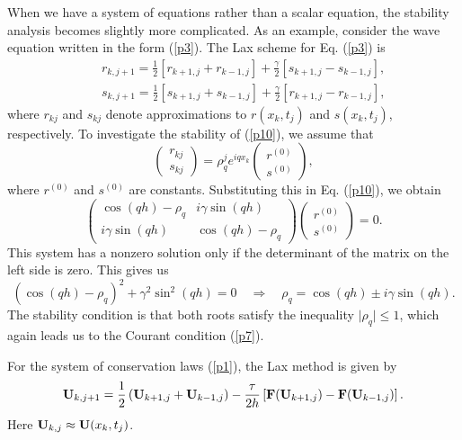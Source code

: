  
 
When we have a system of equations rather than a scalar equation, the stability analysis becomes
slightly more complicated. As an example, consider the wave equation written in the form  (\ref{p3}).
The Lax scheme for Eq. (\ref{p3}) is
\begin{eqnarray}
&&r_{k,j+1}=\frac{1}{2}[r_{k+1,j}+r_{k-1,j}] + \frac{\gamma}{2}\left[s_{k+1,j}-s_{k-1,j}\right], \nonumber \\
&&s_{k,j+1}=\frac{1}{2}[s_{k+1,j}+s_{k-1,j}] +
\frac{\gamma}{2}\left[r_{k+1,j}-r_{k-1,j}\right], \label{p10}
\end{eqnarray}
where $r_{kj}$ and $s_{kj}$ denote approximations to $r(x_{k},t_{j})$ and $s(x_{k},t_{j})$, respectively.
To investigate the stability of (\ref{p10}), we assume that
\begin{equation}
\left(
\begin{array}{c}
r_{kj} \\
s_{kj}
\end{array}
\right)=\rho_{q}^{j}e^{iqx_{k}}
\left(
\begin{array}{c}
r^{(0)} \\
s^{(0)}
\end{array}
\right), \label{p11}
\end{equation}
where $r^{(0)}$ and $s^{(0)}$ are constants.
Substituting this in Eq. (\ref{p10}), we obtain
\begin{equation}
\left(
\begin{array}{cc}
\cos(qh)-\rho_{q} &i\gamma\sin(qh) \\
i\gamma\sin(qh)   &\cos(qh)-\rho_{q}
\end{array}
\right)
\left(
\begin{array}{c}
r^{(0)} \\
s^{(0)}
\end{array}
\right)=0. \nonumber
\end{equation}
This system has a nonzero solution only if the determinant of the matrix on the left side
is zero. This gives us
\[
(\cos(qh)-\rho_{q})^2+\gamma^2\sin^2(qh)=0 \quad \Rightarrow \quad
\rho_{q}=\cos(qh)\pm i\gamma\sin(qh).
\]
The stability condition is that both roots satisfy the inequality $\vert\rho_{q}\vert\leq 1$, which again
leads us to the Courant condition (\ref{p7}).


 
 
For the system of conservation laws (\ref{p1}), the Lax
method is given by
\begin{equation}
{\bf U}_{k,j+1}=\frac{1}{2}\left({\bf U}_{k+1,j}+{\bf U}_{k-1,j}\right) -\frac{\tau}{2h}
\left[{\bf F}({\bf U}_{k+1,j})-{\bf F}({\bf U}_{k-1,j})\right]. \label{ppp1}
\end{equation}
Here ${\bf U}_{k,j}\approx {\bf U}(x_{k},t_{j})$.



